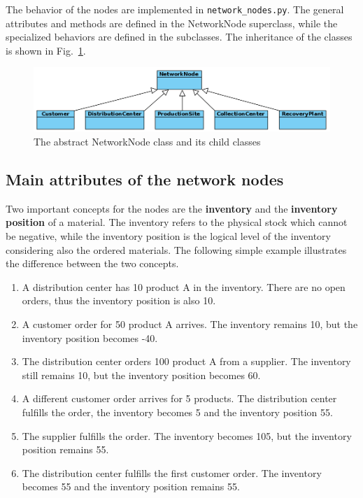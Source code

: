 \documentclass{article}
\begin{document}
The behavior of the nodes are implemented in \texttt{network\_nodes.py}. The general attributes and methods are defined in the NetworkNode superclass, while the specialized behaviors are defined in the subclasses. The inheritance of the classes is shown in Fig.~\ref{fig:nodeclass}. 

\begin{figure}[ht!]
	\center
	\includegraphics[width=\textwidth]{nodeclass.png} 
	\caption{The abstract NetworkNode class and its child classes}\label{fig:nodeclass}
\end{figure}


\subsection{Main attributes of the network nodes}

Two important concepts for the nodes are the \textbf{inventory} and the \textbf{inventory position} of a material. The inventory refers to the physical stock which cannot be negative, while the inventory position is the logical level of the inventory considering also the ordered materials. The following simple example illustrates the difference between the two concepts.

\begin{enumerate}
\item A distribution center has 10 product A in the inventory. There are no open orders, thus the inventory position is also 10.
\item A customer order for 50 product A arrives. The inventory remains 10, but the inventory position becomes -40.
\item The distribution center orders 100 product A from a supplier. The inventory still remains 10, but the inventory position becomes 60.
\item A different customer order arrives for 5 products. The distribution center fulfills the order, the inventory becomes 5 and the inventory position 55.
\item The supplier fulfills the order. The inventory becomes 105, but the inventory position remains 55.
\item The distribution center fulfills the first customer order. The inventory becomes 55 and the inventory position remains 55.
\end{enumerate}
\end{document}
